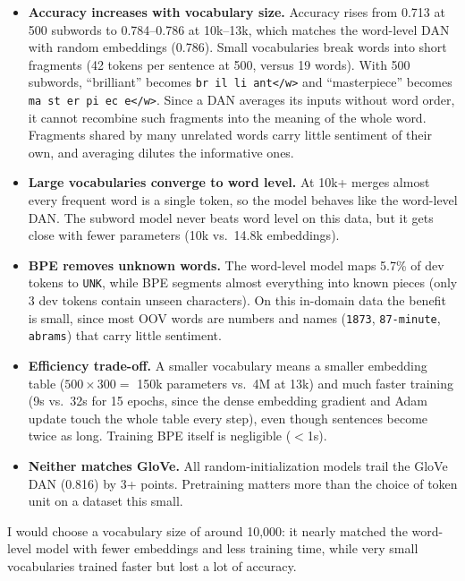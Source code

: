 \documentclass[10pt]{article}
\begin{document}
\begin{itemize}
  \item \textbf{Accuracy increases with vocabulary size.} Accuracy rises from 0.713 at 500 subwords to
        0.784--0.786 at 10k--13k, which matches the word-level DAN with random embeddings (0.786). Small
        vocabularies break words into short fragments (42 tokens per sentence at 500, versus 19 words). With 500
        subwords, ``brilliant'' becomes \texttt{br il li ant</w>} and ``masterpiece'' becomes
        \texttt{ma st er pi ec e</w>}. Since a DAN averages its inputs without word order, it cannot recombine such
        fragments into the meaning of the whole word. Fragments shared by many unrelated words carry little
        sentiment of their own, and averaging dilutes the informative ones.
  \item \textbf{Large vocabularies converge to word level.} At 10k+ merges almost every frequent word is a single
        token, so the model behaves like the word-level DAN. The subword model never beats word level on this data,
        but it gets close with fewer parameters (10k vs.\ 14.8k embeddings).
  \item \textbf{BPE removes unknown words.} The word-level model maps 5.7\% of dev tokens to \texttt{UNK}, while BPE
        segments almost everything into known pieces (only 3 dev tokens contain unseen characters). On this
        in-domain data the benefit is small, since most OOV words are numbers and names (\texttt{1873},
        \texttt{87-minute}, \texttt{abrams}) that carry little sentiment.
  \item \textbf{Efficiency trade-off.} A smaller vocabulary means a smaller embedding table ($500 \times 300 =$
        150k parameters vs.\ 4M at 13k) and much faster training (9s vs.\ 32s for 15 epochs, since the dense
        embedding gradient and Adam update touch the whole table every step), even though sentences become twice as
        long. Training BPE itself is negligible ($<$1s).
  \item \textbf{Neither matches GloVe.} All random-initialization models trail the GloVe DAN (0.816) by 3+ points.
        Pretraining matters more than the choice of token unit on a dataset this small.
\end{itemize}

I would choose a vocabulary size of around 10,000: it nearly matched the word-level model with fewer embeddings and
less training time, while very small vocabularies trained faster but lost a lot of accuracy.
\end{document}

